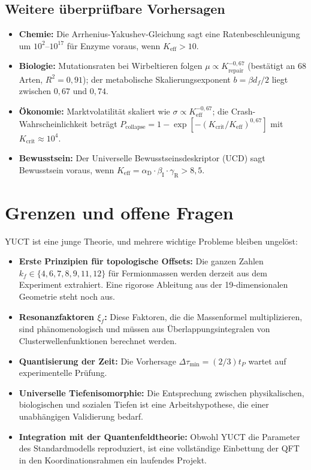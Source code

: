 \documentclass[11pt]{article}
\theoremstyle{remark}
\newcommand{\Keff}{K_{\mathrm{eff}}}
\newcommand{\alD}{\alpha_{\mathrm{D}}}
\newcommand{\beI}{\beta_{\mathrm{I}}}
\newcommand{\gaR}{\gamma_{\mathrm{R}}}
\begin{document}
	\subsection{Weitere überprüfbare Vorhersagen}
	
	\begin{itemize}
		\item \textbf{Chemie:} Die Arrhenius-Yakushev-Gleichung sagt eine Ratenbeschleunigung um \(10^2\)–\(10^{17}\) für Enzyme voraus, wenn \(\Keff > 10\).
		\item \textbf{Biologie:} Mutationsraten bei Wirbeltieren folgen \(\mu \propto K_{\text{repair}}^{-0,67}\) (bestätigt an 68 Arten, \(R^2=0,91\)); der metabolische Skalierungsexponent \(b = \beta d_f/2\) liegt zwischen \(0,67\) und \(0,74\).
		\item \textbf{Ökonomie:} Marktvolatilität skaliert wie \(\sigma \propto \Keff^{-0,67}\); die Crash-Wahrscheinlichkeit beträgt \(P_{\text{collapse}} = 1 - \exp[-(K_{\text{crit}}/\Keff)^{0,67}]\) mit \(K_{\text{crit}} \approx 10^4\).
		\item \textbf{Bewusstsein:} Der Universelle Bewusstseinsdeskriptor (UCD) sagt Bewusstsein voraus, wenn \(\Keff = \alD \cdot \beI \cdot \gaR > 8,5\).
	\end{itemize}
	
	\section{Grenzen und offene Fragen}
	\label{sec:limitations}
	
	YUCT ist eine junge Theorie, und mehrere wichtige Probleme bleiben ungelöst:
	\begin{itemize}
		\item \textbf{Erste Prinzipien für topologische Offsets:} Die ganzen Zahlen \(k_f \in \{4,6,7,8,9,11,12\}\) für Fermionmassen werden derzeit aus dem Experiment extrahiert. Eine rigorose Ableitung aus der 19‑dimensionalen Geometrie steht noch aus.
		\item \textbf{Resonanzfaktoren \(\xi_f\):} Diese Faktoren, die die Massenformel multiplizieren, sind phänomenologisch und müssen aus Überlappungsintegralen von Clusterwellenfunktionen berechnet werden.
		\item \textbf{Quantisierung der Zeit:} Die Vorhersage \(\Delta\tau_{\min} = (2/3) t_P\) wartet auf experimentelle Prüfung.
		\item \textbf{Universelle Tiefenisomorphie:} Die Entsprechung zwischen physikalischen, biologischen und sozialen Tiefen ist eine Arbeitshypothese, die einer unabhängigen Validierung bedarf.
		\item \textbf{Integration mit der Quantenfeldtheorie:} Obwohl YUCT die Parameter des Standardmodells reproduziert, ist eine vollständige Einbettung der QFT in den Koordinationsrahmen ein laufendes Projekt.
	\end{itemize}
	
\end{document}
